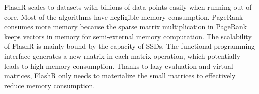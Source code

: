 \documentclass[simplex.tex]{subfiles}
\begin{document}
FlashR scales to datasets with billions of data points easily when running
out of core. Most of the algorithms have negligible memory consumption.
PageRank consumes more memory because the sparse matrix multiplication in
PageRank keeps vectors in memory for semi-external memory computation.
The scalability of FlashR is mainly bound by the capacity of SSDs.
The functional programming
interface generates a new matrix in each matrix operation, which potentially
leads to high memory consumption. Thanks to lazy evaluation and virtual matrices,
FlashR only needs to materialize the small matrices to effectively reduce
memory consumption.


\clearpage
\end{document}
